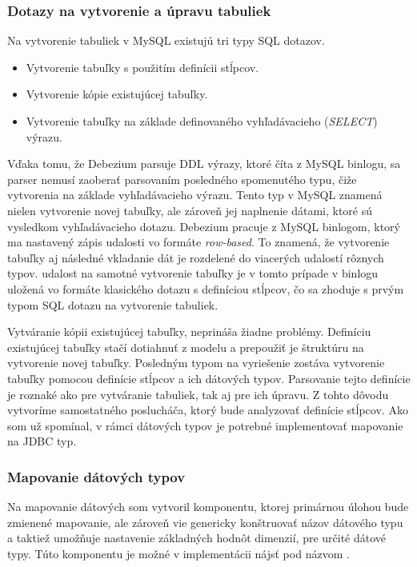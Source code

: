 \subsubsection{Dotazy na vytvorenie a úpravu tabuliek}\label{createAlterTable}
Na vytvorenie tabuliek v MySQL existujú tri typy SQL dotazov. 
\begin{itemize}
\item Vytvorenie tabuľky s použitím definícii stĺpcov.
\item Vytvorenie kópie existujúcej tabuľky.
\item Vytvorenie tabuľky na základe definovaného vyhľadávacieho (\textit{SELECT}) výrazu.
\end{itemize}

Vďaka tomu, že Debezium parsuje DDL výrazy, ktoré číta z MySQL binlogu, sa parser nemusí zaoberať parsovaním posledného spomenutého typu, čiže vytvorenia na základe vyhľadávacieho výrazu. Tento typ v MySQL znamená nielen vytvorenie novej tabuľky, ale zároveň jej naplnenie dátami, ktoré sú vysledkom vyhľadávacieho dotazu. Debezium pracuje z MySQL binlogom, ktorý ma nastavený zápis udalosti vo formáte \textit{row-based}. To znamená, že vytvorenie tabuľky aj následné vkladanie dát je rozdelené do viacerých udalostí rôznych typov. udalost na samotné vytvorenie tabuľky je v tomto prípade v binlogu uložená vo formáte klasického dotazu s definíciou stĺpcov, čo sa zhoduje s prvým typom SQL dotazu na vytvorenie tabuliek.

Vytváranie kópii existujúcej tabuľky, neprináša žiadne problémy. Definíciu existujúcej tabuľky stačí dotiahnuť z modelu a prepoužiť je štruktúru na vytvorenie novej tabuľky. Posledným typom na vyriešenie zostáva vytvorenie tabuľky pomocou definície stĺpcov a ich dátových typov. Parsovanie tejto definície je roznaké ako pre vytváranie tabuliek, tak aj pre ich úpravu. Z tohto dôvodu vytvoríme samostatného poslucháča, ktorý bude analyzovať definície stĺpcov. Ako som už spomínal, v rámci dátových typov je potrebné implementovať mapovanie na JDBC typ.

\subsubsection{Mapovanie dátových typov}
Na mapovanie dátových som vytvoril komponentu, ktorej primárnou úlohou bude zmienené mapovanie, ale zároveň vie genericky konštruovať názov dátového typu a taktiež umožňuje nastavenie základných hodnôt dimenzií, pre určité dátové typy. Túto komponentu je možné v implementácii nájsť pod názvom .

